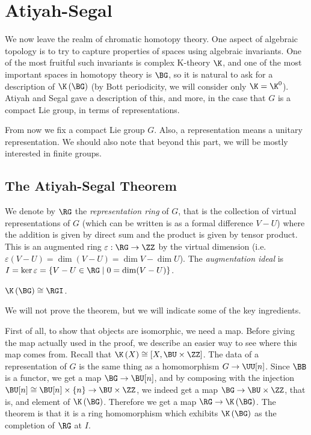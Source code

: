 \section{Atiyah-Segal}

We now leave the realm of chromatic homotopy theory.
One aspect of algebraic topology is to try to capture properties of spaces using algebraic invariants.
One of the most fruitful such invariants is complex K-theory $\K$, and one of the most important spaces in homotopy theory is $\BG$, so it is natural to ask for a description of $\K\left(\BG\right)$ (by Bott periodicity, we will consider only $\K = \K^0$).
Atiyah and Segal \cite{AS} gave a description of this, and more, in the case that $G$ is a compact Lie group, in terms of representations.

From now we fix a compact Lie group $G$.
Also, a representation means a unitary representation.
We should also note that beyond this part, we will be mostly interested in finite groups.

\subsection{The Atiyah-Segal Theorem}

We denote by $\RG$ the \emph{representation ring} of $G$, that is the collection of virtual representations of $G$ (which can be written is as a formal difference $V - U$) where the addition is given by direct sum and the product is given by tensor product.
This is an augmented ring $\varepsilon: \RG \to \ZZ$ by the virtual dimension (i.e. $\varepsilon\left(V-U\right) = \dim\left(V-U\right) = \dim V - \dim U$).
The \emph{augmentation ideal} is $I = \ker \varepsilon = \left\{ V - U \in \RG \mid 0 = \dim(V-U) \right\}$.

\begin{theorem}[{\cite{AS}}]
	$\K\left(\BG\right) \cong \RGI$.
\end{theorem}

We will not prove the theorem, but we will indicate some of the key ingredients.

First of all, to show that objects are isomorphic, we need a map.
Before giving the map actually used in the proof, we describe an easier way to see where this map comes from.
Recall that $\K\left(X\right) \cong \left[X, \BU \times \ZZ\right]$.
The data of a representation of $G$ is the same thing as a homomorphism $G \to \UU[n]$.
Since $\BB$ is a functor, we get a map $\BG \to \BU[n]$, and by composing with the injection $\BU[n] \cong \BU[n] \times \left\{n\right\} \to \BU \times \ZZ$, we indeed get a map $\BG \to \BU \times \ZZ$, that is, and element of $\K\left(\BG\right)$.
Therefore we get a map $\RG \to \K\left(\BG\right)$.
The theorem is that it is a ring homomorphism which exhibits $\K\left(\BG\right)$ as the completion of $\RG$ at $I$.

